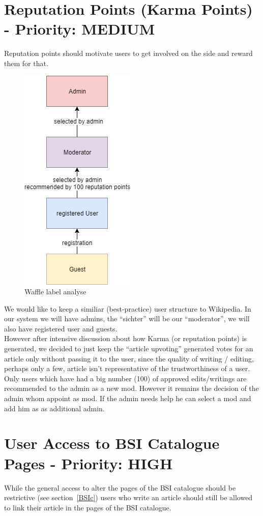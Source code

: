 \section{Reputation Points (Karma Points) - Priority: MEDIUM}
Reputation points should motivate users to get involved on the side and reward them for that.\\

\begin{figure}[h] 
    \centering
    \includegraphics[scale=0.6]{Pictures/UserStructure}
    \caption{Waffle label analyse}
\end{figure} 


We would like to keep a similiar (best-practice) user structure to Wikipedia. In our system we will have admins, the “sichter” will be our “moderator”, we will also have registered user and guests. \\
However after intensive discussion about how Karma (or reputation points) is generated, we decided to just keep the “article upvoting” generated votes for an article only without passing it to the user, since the quality of writing / editing, perhaps only a few, article isn’t representative of the trustworthiness of a user.\\
Only users which have had a big number (100) of approved edits/writings are recommended to the admin as a new mod. However it remains the decision of the admin whom appoint as mod. 
If the admin needs help he can select a mod and add him as as additional admin.


\section{User Access to BSI Catalogue Pages - Priority: HIGH}
\label{2nd_bsi_link}
While the general access to alter the pages of the BSI catalogue should be restrictive (see section~\ref{BSIc}) users who write an article should still be allowed to link their article in the pages of the BSI catalogue.

